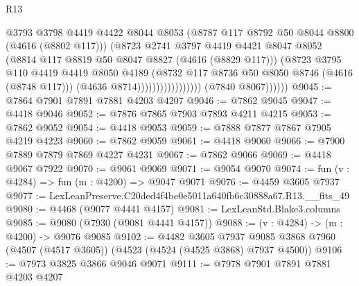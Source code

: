 \begin{lexlean}{R13}
\begin{coremodule}
                                          @3793
                                          @3798
                                          @4419
                                          @4422
                                          @8044
                                          @8053
                                          (@8787 @117 @8792 @50 @8044 @8800 (@4616 (@8802 @117)))
                                          (@8723
                                            @2741
                                            @3797
                                            @4419
                                            @4421
                                            @8047
                                            @8052
                                            (@8814 @117 @8819 @50 @8047 @8827 (@4616 (@8829 @117)))
                                            (@8723
                                              @3795
                                              @110
                                              @4419
                                              @4419
                                              @8050
                                              @4189
                                              (@8732
                                                @117
                                                @8736
                                                @50
                                                @8050
                                                @8746
                                                (@4616 (@8748 @117)))
                                              (@4636 @8714)))))))))))))))))
              (@7840 @8067))))))
@9045 := @7864 @7901 @7891 @7881 @4203 @4207
@9046 := @7862 @9045
@9047 := @4418 @9046
@9052 := @7876 @7865 @7903 @7893 @4211 @4215
@9053 := @7862 @9052
@9054 := @4418 @9053
@9059 := @7888 @7877 @7867 @7905 @4219 @4223
@9060 := @7862 @9059
@9061 := @4418 @9060
@9066 := @7900 @7889 @7879 @7869 @4227 @4231
@9067 := @7862 @9066
@9069 := @4418 @9067 @7922
@9070 := @9061 @9069
@9071 := @9054 @9070
@9074 := fun (v : @4284) => fun (m : @4200) => @9047 @9071
@9076 := @4459 @3605 @7937
@9077 := LexLeanPreserve.C20ded4f4be0e5011a640fb6c30888a67.R13.__fits_49
@9080 := @4468 (@9077 @4441 @4157)
@9081 := LexLeanStd.Blake3.columns
@9085 := @9080 (@7930 (@9081 @4441 @4157))
@9088 := (v : @4284) -> (m : @4200) -> @9076 @9085
@9102 := @4482
    @3605
    @7937
    @9085
    @3868
    @7960
    (@4507 (@4517 @3605))
    (@4523 (@4524 (@4525 @3868) @7937 @4500))
@9106 := @7973 @3825 @3866 @9046 @9071
@9111 := @7978 @7901 @7891 @7881 @4203 @4207

\end{coremodule}
\end{lexlean}
